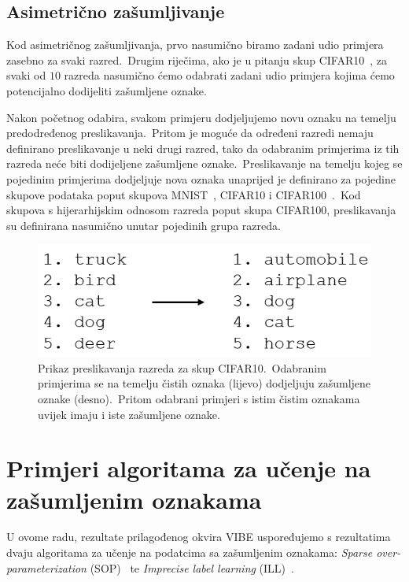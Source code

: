 \documentclass[diplomskirad]{fer}
\begin{document}
\subsection{Asimetrično zašumljivanje}
\label{sub:asym}

Kod asimetričnog zašumljivanja, prvo nasumično biramo zadani udio primjera zasebno za svaki razred.\ 
Drugim riječima, ako je u pitanju skup CIFAR10~\cite{krizhevsky2009learning}, za svaki od $10$ razreda nasumično ćemo odabrati zadani udio primjera kojima ćemo potencijalno dodijeliti zašumljene oznake.\ 

Nakon početnog odabira, svakom primjeru dodjeljujemo novu oznaku na temelju predodređenog preslikavanja.\ 
Pritom je moguće da određeni razredi nemaju definirano preslikavanje u neki drugi razred, tako da odabranim primjerima iz tih razreda neće biti dodijeljene zašumljene oznake.\ 
Preslikavanje na temelju kojeg se pojedinim primjerima dodjeljuje nova oznaka unaprijed je definirano za pojedine skupove podataka poput skupova MNIST~\cite{deng2012mnist}, CIFAR10 i CIFAR100~\cite{krizhevsky2009learning}.\ 
Kod skupova s hijerarhijskim odnosom razreda poput skupa CIFAR100, preslikavanja su definirana nasumično unutar pojedinih grupa razreda.\ 

\begin{figure}[h]
  \centering
  \includegraphics[scale=0.7]{./Slike/asym.png}
  \caption{Prikaz preslikavanja razreda za skup CIFAR10.\ Odabranim primjerima se na temelju čistih oznaka (lijevo) dodjeljuju zašumljene oznake (desno).\ Pritom odabrani primjeri s istim čistim oznakama uvijek imaju i iste zašumljene oznake.}
  \label{fig:asym}
\end{figure}

\pagebreak

\section{Primjeri algoritama za učenje na zašumljenim oznakama}
\label{sek:primjeri_obrana_zasumljivanje}

U ovome radu, rezultate prilagođenog okvira VIBE uspoređujemo s rezultatima dvaju algoritama za učenje na podatcima sa zašumljenim oznakama: \textit{Sparse over-parameterization} (SOP)~\cite{liu2022robust} te \textit{Imprecise label learning} (ILL)~\cite{chen2024imprecise}.\ 
\end{document}
